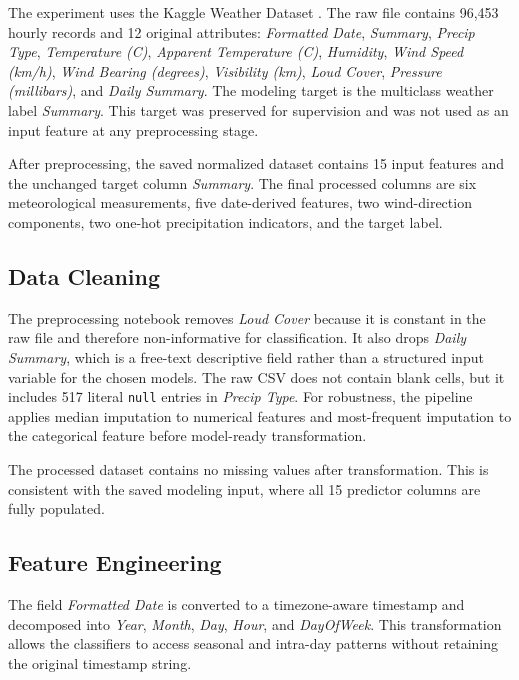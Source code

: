 \documentclass[10pt,letterpaper,twocolumn]{article}
\begin{document}
The experiment uses the Kaggle Weather Dataset \cite{kaggleweather}. The raw file contains 96,453 hourly records and 12 original attributes: \textit{Formatted Date}, \textit{Summary}, \textit{Precip Type}, \textit{Temperature (C)}, \textit{Apparent Temperature (C)}, \textit{Humidity}, \textit{Wind Speed (km/h)}, \textit{Wind Bearing (degrees)}, \textit{Visibility (km)}, \textit{Loud Cover}, \textit{Pressure (millibars)}, and \textit{Daily Summary}. The modeling target is the multiclass weather label \textit{Summary}. This target was preserved for supervision and was not used as an input feature at any preprocessing stage.

After preprocessing, the saved normalized dataset contains 15 input features and the unchanged target column \textit{Summary}. The final processed columns are six meteorological measurements, five date-derived features, two wind-direction components, two one-hot precipitation indicators, and the target label.

\subsection{Data Cleaning}

The preprocessing notebook removes \textit{Loud Cover} because it is constant in the raw file and therefore non-informative for classification. It also drops \textit{Daily Summary}, which is a free-text descriptive field rather than a structured input variable for the chosen models. The raw CSV does not contain blank cells, but it includes 517 literal \texttt{null} entries in \textit{Precip Type}. For robustness, the pipeline applies median imputation to numerical features and most-frequent imputation to the categorical feature before model-ready transformation.

The processed dataset contains no missing values after transformation. This is consistent with the saved modeling input, where all 15 predictor columns are fully populated.

\subsection{Feature Engineering}

The field \textit{Formatted Date} is converted to a timezone-aware timestamp and decomposed into \textit{Year}, \textit{Month}, \textit{Day}, \textit{Hour}, and \textit{DayOfWeek}. This transformation allows the classifiers to access seasonal and intra-day patterns without retaining the original timestamp string.
\end{document}
